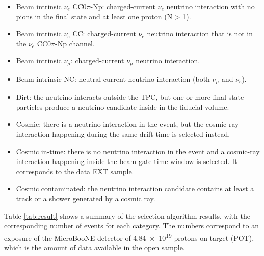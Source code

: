 \documentclass[a4paper]{article}
\begin{document}
\begin{itemize}
\item Beam intrinsic $\nu_{e}$ CC$0\pi$-Np: charged-current $\nu_{e}$ neutrino interaction with no pions in the final state and at least one proton (N > 1).
\item Beam intrinsic $\nu_{e}$ CC: charged-current $\nu_{e}$ neutrino interaction that is not in the $\nu_{e}$ CC$0\pi$-Np channel.
\item Beam intrinsic $\nu_{\mu}$: charged-current $\nu_{\mu}$ neutrino interaction.
\item Beam intrinsic NC: neutral current neutrino interaction (both $\nu_{\mu}$ and $\nu_{e}$).
\item Dirt: the neutrino interacts outside the TPC, but one or more final-state particles produce a neutrino candidate inside in the fiducial volume.
\item Cosmic: there is a neutrino interaction in the event, but the cosmic-ray interaction happening during the same drift time is selected instead.
\item Cosmic in-time: there is no neutrino interaction in the event and a cosmic-ray interaction happening inside the beam gate time window is selected. It corresponds to the data EXT sample.
\item Cosmic contaminated: the neutrino interaction candidate contains at least a track or a shower generated by a cosmic ray.

\end{itemize}

Table \ref{tab:result} shows a summary of the selection algorithm results, with the corresponding number of events for each category. The numbers correspond to an exposure of the MicroBooNE detector of \num{4.84e19} protons on target (POT), which is the amount of data available in the open sample.
\end{document}

